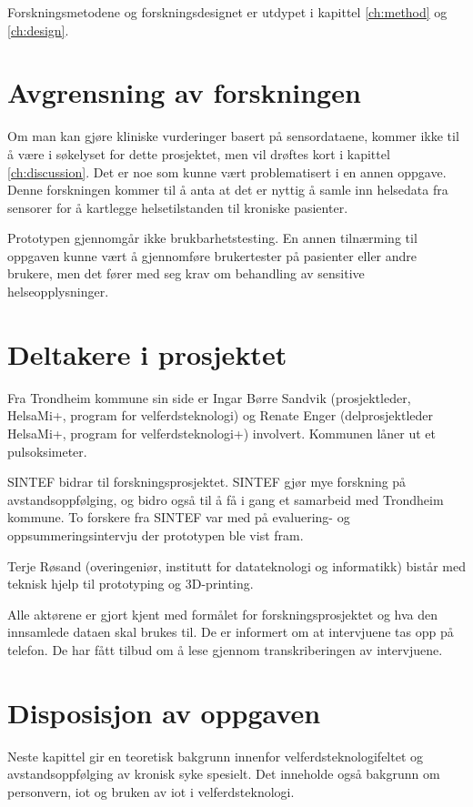 Forskningsmetodene og forskningsdesignet er utdypet i kapittel \ref{ch:method} og \ref{ch:design}.

\section{Avgrensning av forskningen}
Om man kan gjøre kliniske vurderinger basert på sensordataene, kommer ikke til å være i søkelyset for dette prosjektet,
men vil drøftes kort i kapittel \ref{ch:discussion}. Det er noe som kunne vært problematisert i en annen oppgave.
Denne forskningen kommer til å anta at det er nyttig å samle inn helsedata fra sensorer for å kartlegge helsetilstanden til kroniske pasienter.

Prototypen gjennomgår ikke brukbarhetstesting. En annen tilnærming til oppgaven kunne vært å gjennomføre brukertester på pasienter eller andre brukere, men det
fører med seg krav om behandling av sensitive helseopplysninger. %

\section{Deltakere i prosjektet}
Fra Trondheim kommune sin side er Ingar Børre Sandvik (prosjektleder, HelsaMi+, program for velferdsteknologi) og Renate Enger
(delprosjektleder HelsaMi+, program for velferdsteknologi+) involvert. Kommunen låner ut et pulsoksimeter.

SINTEF bidrar til forskningsprosjektet. SINTEF gjør mye forskning på
avstandsoppfølging, og bidro også til å få i gang et samarbeid med Trondheim kommune.
To forskere fra SINTEF var med på evaluering- og oppsummeringsintervju der prototypen
ble vist fram.

Terje Røsand (overingeniør, institutt for datateknologi og informatikk) bistår med teknisk hjelp til prototyping og 3D-printing.

Alle aktørene er gjort kjent med formålet for forskningsprosjektet og hva den innsamlede dataen skal brukes til. De er informert om at
intervjuene tas opp på telefon. De har fått tilbud om å lese gjennom transkriberingen av intervjuene.

\section{Disposisjon av oppgaven}
Neste kapittel gir en teoretisk bakgrunn innenfor velferdsteknologifeltet og avstandsoppfølging av kronisk syke spesielt.
Det inneholde også bakgrunn om personvern, \gls{iot} og bruken av \gls{iot} i velferdsteknologi.

